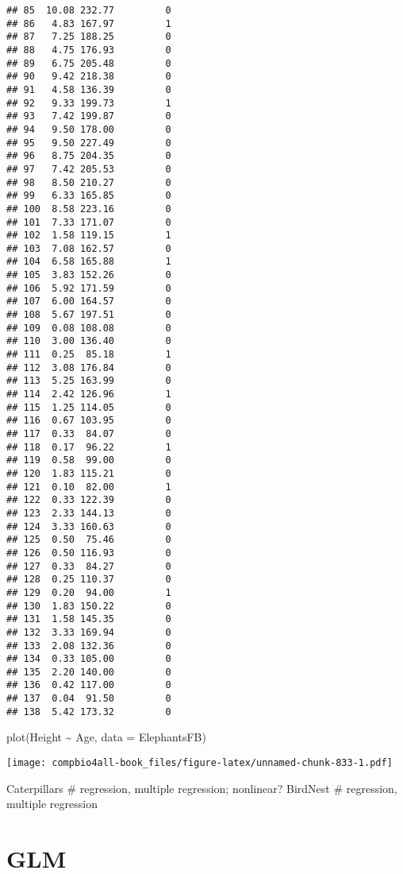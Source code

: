 \documentclass[
]{book}
\newenvironment{Shaded}{\begin{snugshade}}{\end{snugshade}}
\newcommand{\AttributeTok}[1]{\textcolor[rgb]{0.77,0.63,0.00}{#1}}
\newcommand{\FunctionTok}[1]{\textcolor[rgb]{0.00,0.00,0.00}{#1}}
\newcommand{\NormalTok}[1]{#1}
\newcommand{\SpecialCharTok}[1]{\textcolor[rgb]{0.00,0.00,0.00}{#1}}
\begin{document}
\begin{verbatim}
## 85  10.08 232.77         0
## 86   4.83 167.97         1
## 87   7.25 188.25         0
## 88   4.75 176.93         0
## 89   6.75 205.48         0
## 90   9.42 218.38         0
## 91   4.58 136.39         0
## 92   9.33 199.73         1
## 93   7.42 199.87         0
## 94   9.50 178.00         0
## 95   9.50 227.49         0
## 96   8.75 204.35         0
## 97   7.42 205.53         0
## 98   8.50 210.27         0
## 99   6.33 165.85         0
## 100  8.58 223.16         0
## 101  7.33 171.07         0
## 102  1.58 119.15         1
## 103  7.08 162.57         0
## 104  6.58 165.88         1
## 105  3.83 152.26         0
## 106  5.92 171.59         0
## 107  6.00 164.57         0
## 108  5.67 197.51         0
## 109  0.08 108.08         0
## 110  3.00 136.40         0
## 111  0.25  85.18         1
## 112  3.08 176.84         0
## 113  5.25 163.99         0
## 114  2.42 126.96         1
## 115  1.25 114.05         0
## 116  0.67 103.95         0
## 117  0.33  84.07         0
## 118  0.17  96.22         1
## 119  0.58  99.00         0
## 120  1.83 115.21         0
## 121  0.10  82.00         1
## 122  0.33 122.39         0
## 123  2.33 144.13         0
## 124  3.33 160.63         0
## 125  0.50  75.46         0
## 126  0.50 116.93         0
## 127  0.33  84.27         0
## 128  0.25 110.37         0
## 129  0.20  94.00         1
## 130  1.83 150.22         0
## 131  1.58 145.35         0
## 132  3.33 169.94         0
## 133  2.08 132.36         0
## 134  0.33 105.00         0
## 135  2.20 140.00         0
## 136  0.42 117.00         0
## 137  0.04  91.50         0
## 138  5.42 173.32         0
\end{verbatim}

\begin{Shaded}
\begin{Highlighting}[]
\FunctionTok{plot}\NormalTok{(Height }\SpecialCharTok{\textasciitilde{}}\NormalTok{ Age, }\AttributeTok{data =}\NormalTok{ ElephantsFB)}
\end{Highlighting}
\end{Shaded}

\texttt{[image: compbio4all-book\_files/figure-latex/unnamed-chunk-833-1.pdf]}

Caterpillars \# regression, multiple regression; nonlinear?
BirdNest \# regression, multiple regression

\hypertarget{glm}{%
\section{GLM}\label{glm}}
\end{document}
